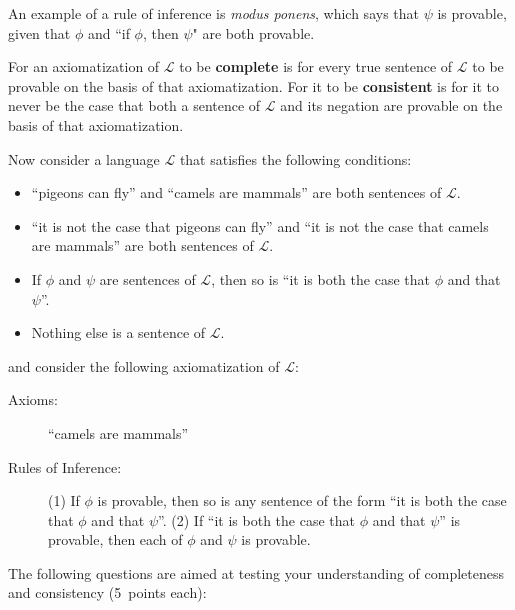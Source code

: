 \documentclass[12pt,a4paper]{article}
\begin{document}
\begin{enumerate}
{\begin{itemize}
An example of a rule of inference is \emph{modus ponens}, which says that $\psi$ is provable, given that $\phi$ and ``if $\phi$, then $\psi$" are both provable.


\end{itemize}
For an axiomatization of $\mathcal{L}$ to be \textbf{complete} is for every true sentence of $\mathcal{L}$ to be provable on the basis of that axiomatization. For it to be \textbf{consistent} is for it to never be the case that both a sentence of $\mathcal{L}$ and its negation are provable on the basis of that axiomatization.

Now consider a language $\mathcal{L}$ that satisfies the following conditions:

\begin{itemize}

\item ``pigeons can fly'' and ``camels are mammals'' are both sentences of $\mathcal{L}$.

\item ``it is not the case that pigeons can fly'' and ``it is not the case that camels are mammals''  are both sentences of $\mathcal{L}$.

\item If $\phi$ and $\psi$ are sentences of $\mathcal{L}$, then so is ``it is both the case that $\phi$ and that $\psi$''.

\item Nothing else is a sentence of $\mathcal{L}$.

\end{itemize}
and consider the following axiomatization of $\mathcal{L}$:

\begin{description}

\item[Axioms:] ``camels are mammals''

\item[Rules of Inference:] (1) If $\phi$ is provable, then so is any sentence of the form ``it is both the case that $\phi$  and that $\psi$''. (2) If ``it is both the case that $\phi$ and that $\psi$'' is provable, then each of $\phi$ and $\psi$ is provable.

\end{description}

}
The following questions are aimed at testing your understanding of completeness and consistency (5~points each):
\begin{enumerate}




\end{enumerate}
\end{enumerate}
\end{document}
